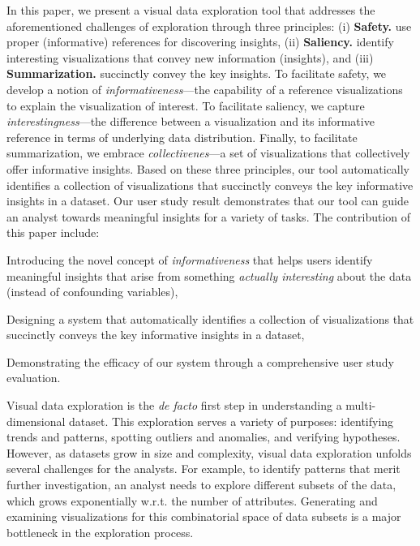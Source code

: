 In this paper, we present a visual data exploration tool that addresses the aforementioned challenges of exploration through three principles: (i) \textbf{Safety.} use proper (informative) references for discovering insights, (ii)  \textbf{Saliency.} identify interesting visualizations that convey new information (insights), and (iii) \textbf{Summarization.} succinctly convey the key insights. To facilitate safety, we develop a notion of \emph{informativeness}---the capability of a reference visualizations to explain the visualization of interest. To facilitate saliency, we capture \emph{interestingness}---the difference between a visualization and its informative reference in terms of underlying data distribution. Finally, to facilitate summarization, we embrace \emph{collectivenes}---a set of visualizations that collectively offer informative insights. Based on these three principles, our tool automatically identifies a collection of visualizations that succinctly conveys the key informative insights in a dataset. Our user study result demonstrates that our tool can guide an analyst towards meaningful insights for a variety of tasks. The contribution of this paper include:
\begin{denselist}
\item Introducing the novel concept of \emph{informativeness} that helps users identify meaningful insights that arise from something \textit{actually interesting} about the data (instead of confounding variables),
\item Designing a system that automatically identifies a collection of visualizations that succinctly conveys the key informative insights in a dataset,
\item Demonstrating the efficacy of our system through a comprehensive user study evaluation.
\end{denselist}

\iffalse

Visual data exploration is the \emph{de facto} first step in understanding a multi-dimensional dataset. This exploration serves a variety of purposes: identifying trends and patterns, spotting outliers and anomalies, and verifying hypotheses. However, as datasets grow in size and complexity, visual data exploration unfolds several challenges for the analysts. For example, to identify patterns that merit further investigation, an analyst needs to explore different subsets of the data, which grows exponentially w.r.t. the number of attributes. Generating and examining visualizations for this combinatorial space of data subsets is a major bottleneck in the exploration process.

